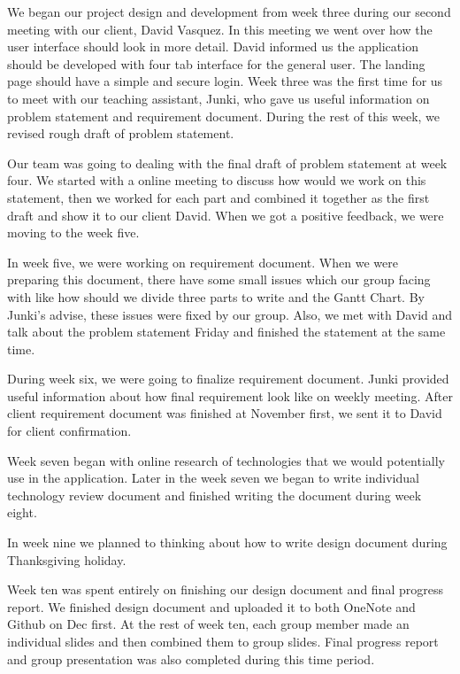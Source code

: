 \documentclass[letterpaper, 10pt,titlepage]{article}
\begin{document}
We began our project design and development from week three during our second meeting with our client, David Vasquez. In this meeting we went over how the user interface should look in more detail. David informed us the application should be developed with four tab interface for the general user. The landing page should have a simple and secure login. Week three was the first time for us to meet with our teaching assistant, Junki, who gave us useful information on problem statement and requirement document. During the rest of this week, we revised rough draft of problem statement. 

Our team was going to dealing with the final draft of problem statement at week four. We started with a online meeting to discuss how would we work on this statement, then we worked for each part and combined it together as the first draft and show it to our client David. When we got a positive feedback, we were moving to the week five.

In week five, we were working on requirement document. When we were preparing this document, there have some small issues which our group facing with like how should we divide three parts to write and the Gantt Chart. By Junki's advise, these issues were fixed by our group. Also, we met with David and talk about the problem statement Friday and finished the statement at the same time.

During week six, we were going to finalize requirement document. Junki provided useful information about how final requirement look like on weekly meeting. After client requirement document was finished at November first, we sent it to David for client confirmation.  

Week seven began with online research of technologies that we would potentially use in the application. Later in the week seven we began to write individual technology review document and finished writing the document during week eight.

In week nine we planned to thinking about how to write design document during Thanksgiving holiday. 

Week ten was spent entirely on finishing our design document and final progress report. We finished design document and uploaded it to both OneNote and Github on Dec first. At the rest of week ten, each group member made an individual slides and then combined them to group slides. Final progress report and group presentation was also completed during this time period. 
\end{document}
